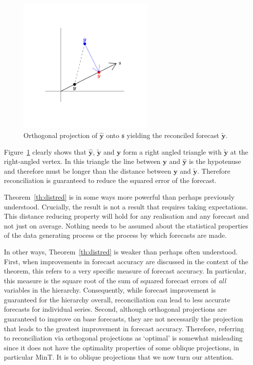 \documentclass[12pt]{article}
\theoremstyle{definition}
\begin{document}
\begin{figure}[!hbt]
  \centering \includegraphics[width=0.6\textwidth]{Figs/orth_pointforerec_schematic.pdf}
  \caption{Orthogonal projection of $\hat{\bm{y}}$ onto $\mathfrak{s}$ yielding the reconciled forecast $\tilde{\bm{y}}$.}\label{fig:Schematic_OLSRecon}
\end{figure}

Figure~\ref{fig:Schematic_OLSRecon} clearly shows that $\hat{\bm{y}}$, $\tilde{\bm{y}}$ and $\bm{y}$ form a right angled triangle with $\tilde{\bm{y}}$ at the right-angled vertex. In this triangle the line between $\bm{y}$ and $\hat{\bm{y}}$ is the hypotenuse and therefore must be longer than the distance between $\bm{y}$ and $\tilde{\bm{y}}$. Therefore reconciliation is guaranteed to reduce the squared error of the forecast.

Theorem~\ref{th:distred} is in some ways more powerful than perhaps previously understood. Crucially, the result is not a result that requires taking expectations. This distance reducing property will hold for any realisation and any forecast and not just on average. Nothing needs to be assumed about the statistical properties of the data generating process or the process by which forecasts are made.

In other ways, Theorem~\ref{th:distred} is weaker than perhaps often understood. First, when improvements in forecast accuracy are discussed in the context of the theorem, this refers to a very specific measure of forecast accuracy. In particular, this measure is the square root of the sum of squared forecast errors of \emph{all} variables in the hierarchy. Consequently, while forecast improvement is guaranteed for the hierarchy overall, reconciliation can lead to less accurate forecasts for individual series. Second, although orthogonal projections are guaranteed to improve on base forecasts, they are not necessarily the projection that leads to the greatest improvement in forecast accuracy. Therefore, referring to reconciliation via orthogonal projections as `optimal' is somewhat misleading since it does not have the optimality properties of some oblique projections, in particular MinT\@. It is to oblique projections that we now turn our attention.
\end{document}
